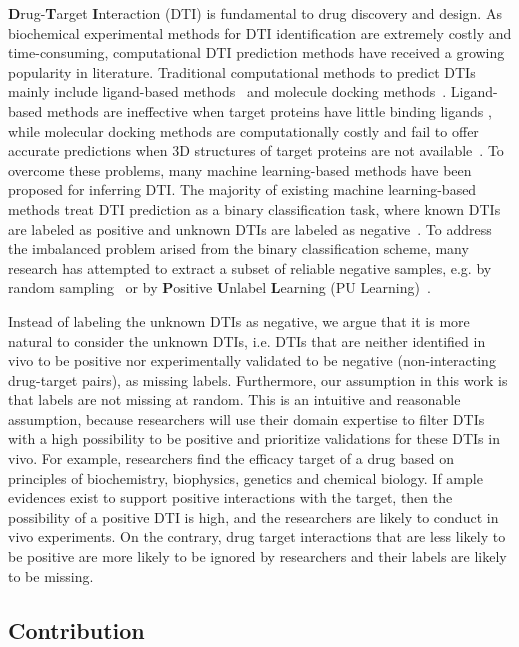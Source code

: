 \documentclass[conference]{IEEEtran}
\begin{document}
\textbf{D}rug-\textbf{T}arget \textbf{I}nteraction (DTI) is fundamental to drug discovery and design. As biochemical experimental methods for DTI identification are extremely costly and time-consuming, computational DTI prediction methods have received a growing popularity in literature. Traditional computational methods to predict DTIs mainly include ligand-based methods~\cite{Keiser2007ligand} and molecule docking methods~\cite{Cheng2007docking}. Ligand-based methods are ineffective when target proteins have little binding ligands , while molecular docking methods are computationally costly and fail to offer accurate predictions when 3D structures of target proteins are not available~\cite{Chen2016docking}. To overcome these problems, many machine learning-based methods have been proposed for inferring DTI. The majority of existing machine learning-based methods treat DTI prediction as a binary classification task, where known DTIs are labeled as positive and unknown DTIs are labeled as negative~\cite{Ding2013Similarity}. To address the imbalanced problem arised from the binary classification scheme, many research has attempted to extract a subset of reliable negative samples, e.g. by random sampling~\cite{Luo2017Network} or by \textbf{P}ositive \textbf{U}nlabel \textbf{L}earning (PU Learning)~\cite{Peng2017Screening}.


Instead of labeling the unknown DTIs as negative, we argue that it is more natural to consider the unknown DTIs, i.e. DTIs that are neither identified in vivo to be positive nor experimentally validated to be negative (non-interacting drug-target pairs), as missing labels. Furthermore, our assumption in this work is that labels are not missing at random. This is an intuitive and reasonable assumption, because researchers will use their domain expertise to filter DTIs with a high possibility to be positive and prioritize validations for these DTIs in vivo. For example, researchers find the efficacy target of a drug based on principles of biochemistry, biophysics, genetics and chemical biology. If ample evidences exist to support positive interactions with the target, then the possibility of a positive DTI is high, and the researchers are likely to conduct in vivo experiments. On the contrary, drug target interactions that are less likely to be positive are more likely to be ignored by researchers and their labels are likely to be missing.
\subsection{Contribution}
\end{document}
